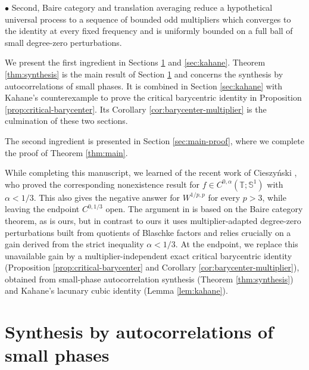 \documentclass[11pt]{amsart}
\theoremstyle{definition}
\theoremstyle{remark}
\newcommand{\T}{\mathbb T}
\newcommand{\Sone}{\mathbb S^1}
\begin{document}
$\bullet$ Second, Baire category and translation averaging reduce a hypothetical universal process to a sequence of bounded odd multipliers which converges to the identity at every fixed frequency and is uniformly bounded on a full ball of small degree-zero perturbations.  

\medskip

We present the first ingredient in Sections \ref{sec:synthesis} and \ref{sec:kahane}. Theorem \ref{thm:synthesis} is the main result of Section \ref{sec:synthesis} and concerns the synthesis by autocorrelations of small phases. It is combined in Section \ref{sec:kahane} with Kahane's counterexample to prove the critical barycentric identity in Proposition \ref{prop:critical-barycenter}. Its Corollary \ref{cor:barycenter-multiplier} is the culmination of these two sections.

The second ingredient is presented in Section \ref{sec:main-proof}, where we complete the proof of Theorem \ref{thm:main}.

\medskip

While completing this manuscript, we learned of the recent work of
Cieszyński \cite{Cieszynski2026}, who proved the corresponding
nonexistence result for $f\in C^{0,\alpha}(\T;\Sone)$ with $\alpha<1/3$. This also gives the negative answer for $W^{1/p,p}$ for every $p>3$, while leaving the endpoint $C^{0,1/3}$ open. The argument in \cite{Cieszynski2026} is based on the Baire category theorem, as is ours, but in contrast to ours it uses multiplier-adapted degree-zero
perturbations built from quotients of Blaschke factors and relies crucially on a gain derived from the strict inequality $\alpha<1/3$. At the endpoint, we replace this unavailable gain by a multiplier-independent exact critical
barycentric identity (Proposition \ref{prop:critical-barycenter} and Corollary \ref{cor:barycenter-multiplier}), obtained from small-phase autocorrelation synthesis (Theorem \ref{thm:synthesis}) and Kahane's lacunary cubic identity (Lemma \ref{lem:kahane}).




\section{Synthesis by autocorrelations of small phases}\label{sec:synthesis}
\end{document}
